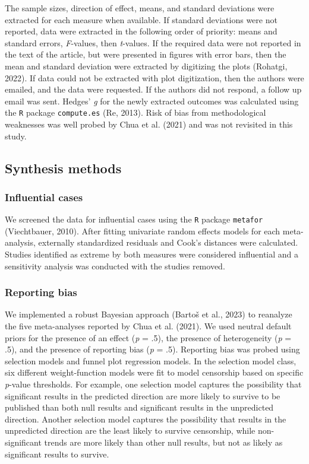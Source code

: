 \documentclass[
  11pt,
  doc, donotrepeattitle,floatsintext]{apa7}
\begin{document}
The sample sizes, direction of effect, means, and standard deviations were extracted for each measure when available. If standard deviations were not reported, data were extracted in the following order of priority: means and standard errors, \emph{F}-values, then \emph{t}-values. If the required data were not reported in the text of the article, but were presented in figures with error bars, then the mean and standard deviation were extracted by digitizing the plots (Rohatgi, 2022). If data could not be extracted with plot digitization, then the authors were emailed, and the data were requested. If the authors did not respond, a follow up email was sent. Hedges' \emph{g} for the newly extracted outcomes was calculated using the \texttt{R} package \texttt{compute.es} (Re, 2013). Risk of bias from methodological weaknesses was well probed by Chua et al. (2021) and was not revisited in this study.

\hypertarget{synthesis-methods}{%
\subsection{Synthesis methods}\label{synthesis-methods}}

\hypertarget{influential-cases}{%
\subsubsection{Influential cases}\label{influential-cases}}

We screened the data for influential cases using the \texttt{R} package \texttt{metafor} (Viechtbauer, 2010). After fitting univariate random effects models for each meta-analysis, externally standardized residuals and Cook's distances were calculated. Studies identified as extreme by both measures were considered influential and a sensitivity analysis was conducted with the studies removed.

\hypertarget{reporting-bias}{%
\subsubsection{Reporting bias}\label{reporting-bias}}

We implemented a robust Bayesian approach (Bartoš et al., 2023) to reanalyze the five meta-analyses reported by Chua et al. (2021). We used neutral default priors for the presence of an effect (\emph{p} = .5), the presence of heterogeneity (\emph{p} = .5), and the presence of reporting bias (\emph{p} = .5). Reporting bias was probed using selection models and funnel plot regression models. In the selection model class, six different weight-function models were fit to model censorship based on specific \emph{p}-value thresholds. For example, one selection model captures the possibility that significant results in the predicted direction are more likely to survive to be published than both null results and significant results in the unpredicted direction. Another selection model captures the possibility that results in the unpredicted direction are the least likely to survive censorship, while non-significant trends are more likely than other null results, but not as likely as significant results to survive.
\end{document}
